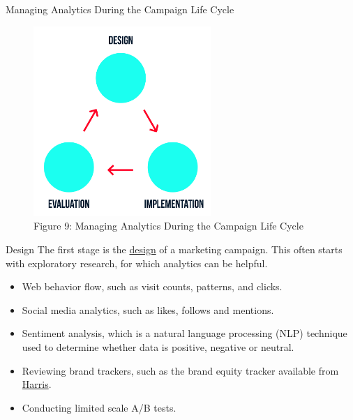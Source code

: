 \documentclass[pdf]{beamer}
\theoremstyle{remark}
\theoremstyle{definition}
\begin{document}
\begin{frame}[t]{Managing Analytics During the Campaign Life Cycle}
\begin{figure}[htbp]
    \centering
    \captionsetup{justification=centering}
    \includegraphics[clip, trim=0.0cm 0.0cm 0.0cm 0.0cm, width=0.6\textwidth]{Images/Figure_12_4_2.jpg}  
    \caption{Figure {\color{franklinblue} 9}: Managing Analytics During the Campaign Life Cycle}
    \label{fig:camplc}
\end{figure} 
\end{frame}

\begin{frame}[t]{Design}
The first stage is the \underline{design} of a marketing campaign. This often starts with exploratory research, for which analytics can be helpful. \\
\vspace{1.5ex}
\begin{itemize}
\item Web behavior flow, such as visit counts, patterns, and clicks.
\item Social media analytics, such as likes, follows and mentions. 
\item Sentiment analysis, which is a natural language processing (NLP) technique used to determine whether data is positive, negative or neutral. 
\item Reviewing brand trackers, such as the brand equity tracker available from \href{https://theharrispoll.com/solutions/harris-brand-platform/brand-equity/}{Harris}.
\item Conducting limited scale A/B tests. 
\end{itemize}
\end{frame}
\end{document}
